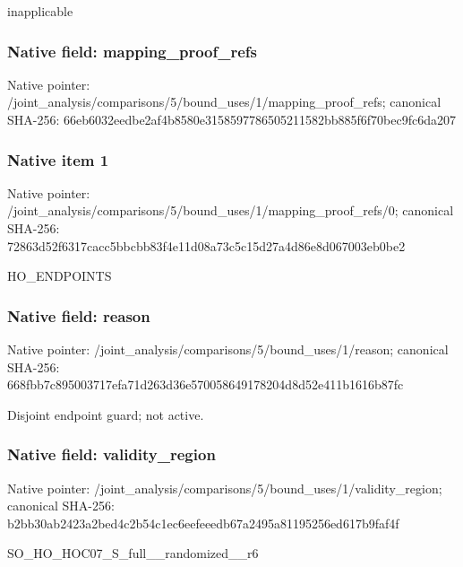\documentclass[10pt,a4paper]{article}
\begin{document}
\begingroup\raggedright\sloppy inapplicable\par\endgroup

\subsubsection{Native field: mapping\_\allowbreak{}proof\_\allowbreak{}refs}
Native pointer: /joint\_\allowbreak{}analysis/comparisons/5/bound\_\allowbreak{}uses/1/mapping\_\allowbreak{}proof\_\allowbreak{}refs; canonical SHA-256: 66eb6032eedbe2af4b8580e3158597786505211582bb885f6f70bec9fc6da207

\subsubsection{Native item 1}
Native pointer: /joint\_\allowbreak{}analysis/comparisons/5/bound\_\allowbreak{}uses/1/mapping\_\allowbreak{}proof\_\allowbreak{}refs/0; canonical SHA-256: 72863d52f6317cacc5bbcbb83f4e11d08a73c5c15d27a4d86e8d067003eb0be2

\begingroup\raggedright\sloppy HO\_\allowbreak{}ENDPOINTS\par\endgroup

\subsubsection{Native field: reason}
Native pointer: /joint\_\allowbreak{}analysis/comparisons/5/bound\_\allowbreak{}uses/1/reason; canonical SHA-256: 668fbb7c895003717efa71d263d36e570058649178204d8d52e411b1616b87fc

\begingroup\raggedright\sloppy Disjoint endpoint guard;\allowbreak{} not active.\par\endgroup

\subsubsection{Native field: validity\_\allowbreak{}region}
Native pointer: /joint\_\allowbreak{}analysis/comparisons/5/bound\_\allowbreak{}uses/1/validity\_\allowbreak{}region; canonical SHA-256: b2bb30ab2423a2bed4c2b54c1ec6eefeeedb67a2495a81195256ed617b9faf4f

\begingroup\raggedright\sloppy SO\_\allowbreak{}HO\_\allowbreak{}HOC07\_\allowbreak{}S\_\allowbreak{}full\_\allowbreak{}\_\allowbreak{}randomized\_\allowbreak{}\_\allowbreak{}r6\par\endgroup
\end{document}
